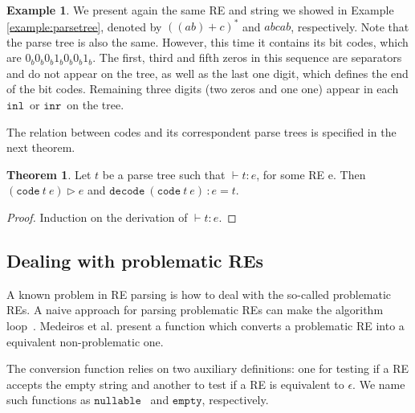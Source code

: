 \documentclass[review]{elsarticle}
\newcommand{\inl}{\ensuremath{\texttt{inl}}}
\newcommand{\inr}{\ensuremath{\texttt{inr}}}
\newcommand{\code}{\ensuremath{\texttt{code}}}
\newcommand{\decodee}{\ensuremath{\texttt{decode}}}
\newcommand{\nullable}{\ensuremath{\texttt{nullable}}}
\newcommand{\emptyy}{\ensuremath{\texttt{empty}}}
\theoremstyle{definition}
\newtheorem{Theorem}{Theorem}
\newtheorem{Example}{Example}
\begin{document}
\begin{Example}
We present again the same RE and string we showed in Example \ref{example:parsetree},
denoted by $((ab) + c)^*$ and $abcab$, respectively. Note that the parse tree is also the same.
However, this time it contains its bit codes, which are $0_b0_b0_b1_b0_b0_b1_b$. The first, third and fifth
zeros in this sequence are separators and do not appear on the tree, as well as the last one
digit, which defines the end of the bit codes. Remaining three digits (two zeros and one one)
appear in each $\inl\,$ or $\inr\,$ on the tree.

\begin{center}
\end{center}

\end{Example}


The relation between codes and its correspondent parse trees is specified in the next
theorem.

\begin{Theorem}
  Let $t$ be a parse tree such that $\vdash t : e$, for some RE e. Then $(\code\: t\: e) \rhd e$ and
  $\decodee\:(\code\: t\: e)\,: e = t$.
\end{Theorem}
\begin{proof}
  Induction on the derivation of $\vdash t : e$.
\end{proof}


\subsection{Dealing with problematic REs}\label{subsection:problematic}

A known problem in RE parsing is how to deal with the so-called problematic REs. A naive approach for 
parsing problematic REs can make the algorithm loop~\cite{Frisch2004}. Medeiros et al. \cite{Medeiros14}
present a function which converts a problematic RE into a equivalent non-problematic one.

The conversion function relies on two auxiliary definitions: one for testing if a RE accepts the empty string and 
another to test if a RE is equivalent to $\epsilon$. We name such functions as \nullable~ and \emptyy, 
respectively.
\end{document}
